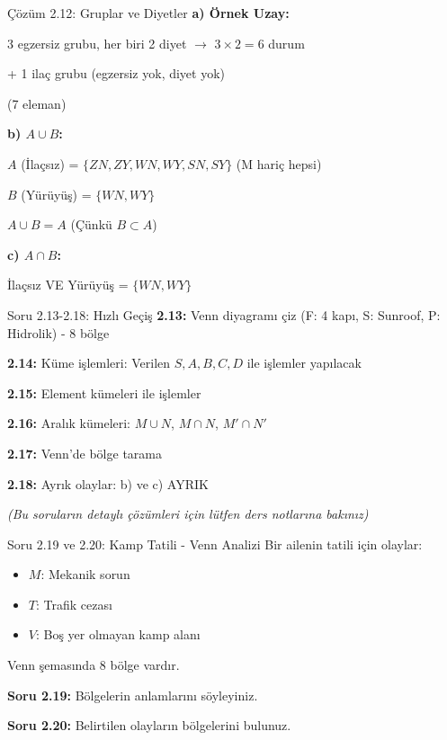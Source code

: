 \documentclass[light]{lutbeamer}
\begin{document}
\begin{frame}{Çözüm 2.12: Gruplar ve Diyetler}
    \color{blue}
    \textbf{a) Örnek Uzay:}
    
    3 egzersiz grubu, her biri 2 diyet $\rightarrow$ $3 \times 2 = 6$ durum
    
    + 1 ilaç grubu (egzersiz yok, diyet yok)
    
    \begin{center}
     (7 eleman)
    \end{center}
    
    \vspace{0.3cm}
    \textbf{b) $A \cup B$:}
    
    $A$ (İlaçsız) = $\{ZN, ZY, WN, WY, SN, SY\}$ (M hariç hepsi)
    
    $B$ (Yürüyüş) = $\{WN, WY\}$
    
    $A \cup B = A$ (Çünkü $B \subset A$)
    
    \textbf{c) $A \cap B$:}
    
    İlaçsız VE Yürüyüş = $\{WN, WY\}$
\end{frame}

\begin{frame}{Soru 2.13-2.18: Hızlı Geçiş}
    \color{blue}
    \small
    \textbf{2.13:} Venn diyagramı çiz (F: 4 kapı, S: Sunroof, P: Hidrolik) - 8 bölge
    
    \textbf{2.14:} Küme işlemleri: Verilen $S, A, B, C, D$ ile işlemler yapılacak
    
    \textbf{2.15:} Element kümeleri ile işlemler
    
    \textbf{2.16:} Aralık kümeleri: $M \cup N$, $M \cap N$, $M' \cap N'$
    
    \textbf{2.17:} Venn'de bölge tarama
    
    \textbf{2.18:} Ayrık olaylar: b) ve c) AYRIK
    
    \textit{(Bu soruların detaylı çözümleri için lütfen ders notlarına bakınız)}
\end{frame}

\begin{frame}{Soru 2.19 ve 2.20: Kamp Tatili - Venn Analizi}
    Bir ailenin tatili için olaylar:
    \begin{itemize}
        \item $M$: Mekanik sorun
        \item $T$: Trafik cezası
        \item $V$: Boş yer olmayan kamp alanı
    \end{itemize}
    
    Venn şemasında 8 bölge vardır.
    
    \textbf{Soru 2.19:} Bölgelerin anlamlarını söyleyiniz.
    
    \textbf{Soru 2.20:} Belirtilen olayların bölgelerini bulunuz.
\end{frame}
\end{document}
